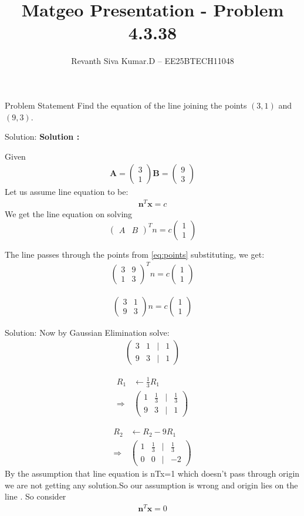 \documentclass{beamer}
\title{Matgeo Presentation - Problem 4.3.38}
\author{Revanth Siva Kumar.D -- EE25BTECH11048}
\numberwithin{equation}{section}
\newcommand{\myvec}[1]{\ensuremath{\begin{pmatrix}#1\end{pmatrix}}}
\let\vec\mathbf
\begin{document}
\begin{frame}
\titlepage
\end{frame}

\begin{frame}{Problem Statement}
Find the equation of the line joining the points $(3,1)$ and $(9,3)$. 
\end{frame}

\begin{frame}{Solution:}
\textbf{Solution :} 

Given 
\begin{align}
    \vec{A}=\myvec{3\\1} \vec{B}=\myvec{9\\3} 
    \label{eq:points}
\end{align}
Let us assume line equation to be:
\begin{align}
    \vec{n}^T \vec{x} = c
\end{align} 
    We get the line equation on solving \[\myvec{A&B}^Tn=c\myvec{1\\1}\] 

The line passes through the points from \eqref{eq:points} substituting, we get:
\begin{align}
    \myvec{3 & 9 \\
       1 & 3  }^Tn=c\myvec{1 \\ 1}
\end{align}

\begin{align}
    \myvec{3 & 1 \\
       9 & 3  }n=c\myvec{1 \\ 1}
\end{align}
\end{frame}
\begin{frame}{Solution:}
Now by Gaussian Elimination solve:
\begin{align}
\myvec{3 & 1 & \big| & 1 \\
         9 & 3 & \big| & 1 }
\end{align}

\begin{align}
R_{1} &\leftarrow \frac{1}{3}R_{1} \nonumber\\
\Rightarrow\ 
&\myvec{1 & \frac{1}{3} & \big| & \frac{1}{3} \\
         9 & 3 & \big| & 1 }
\end{align}

\begin{align}
R_{2} &\leftarrow R_{2}-9R_{1} \nonumber\\
\Rightarrow\ 
&\myvec{1 & \frac{1}{3} & \big| & \frac{1}{3} \\
         0 & 0 & \big| & -2 }
\end{align}
By the assumption that line equation is nTx=1 which doesn't pass through origin we are not getting any solution.So our assumption is wrong and origin lies on the line . 
So consider \begin{align}
    \vec{n}^T \vec{x} = 0
\end{align} 
\end{frame}
\end{document}
